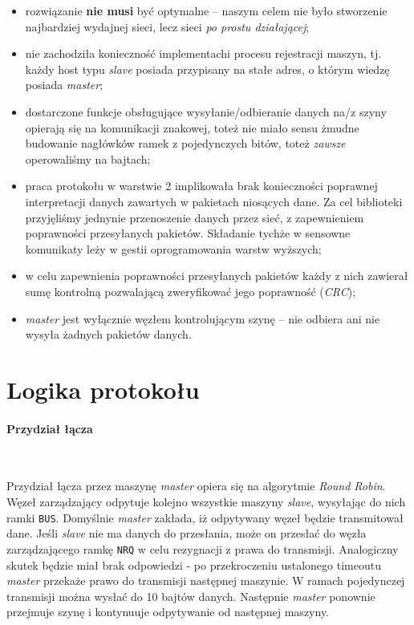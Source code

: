 \documentclass[a4paper,12pt]{article}
\begin{document}
\begin{itemize}
  \item rozwiązanie \textbf{nie musi} być optymalne -- naszym celem nie było
        stworzenie najbardziej wydajnej sieci, lecz sieci \emph{po prostu
        działającej};
  \item nie zachodziła konieczność implementachi procesu rejestracji maszyn,
        tj. każdy host typu \emph{slave} posiada przypisany na stałe adres,
        o którym wiedzę posiada \emph{master};
  \item dostarczone funkcje obsługujące wysyłanie/odbieranie danych na/z
        szyny opierają się na komunikacji znakowej, toteż nie miało sensu
        żmudne budowanie nagłówków ramek z pojedynczych bitów, toteż
        \emph{zawsze} operowaliśmy na bajtach;
  \item praca protokołu w warstwie 2 implikowała brak konieczności poprawnej
        interpretacji danych zawartych w pakietach niosących dane. Za cel
        biblioteki przyjęliśmy jednynie przenoszenie danych przez sieć, z
        zapewnieniem poprawności przesyłanych pakietów. Składanie tychże w
        sensowne komunikaty leży w gestii oprogramowania warstw wyższych;
  \item w celu zapewnienia poprawności przesyłanych pakietów każdy z nich
        zawierał sumę kontrolną pozwalającą zweryfikować jego poprawność
        (\emph{CRC});
  \item \emph{master} jest wyłącznie węzłem kontrolującym szynę -- nie
        odbiera ani nie wysyła żadnych pakietów danych.
\end{itemize}

\section{Logika protokołu}

\paragraph{Przydział łącza}\

Przydział łącza przez maszynę \emph{master} opiera się na algorytmie
\emph{Round Robin}. Węzeł zarządzający odpytuje kolejno wszystkie maszyny
\emph{slave}, wysyłając do nich ramki \texttt{BUS}. Domyślnie \emph{master}
zakłada, iż odpytywany węzeł będzie transmitował dane. Jeśli \emph{slave} nie
ma danych do przesłania, może on przesłać do węzła zarządzającego ramkę
\texttt{NRQ} w celu rezygnacji z prawa do transmisji. Analogiczny skutek będzie
miał brak odpowiedzi - po przekroczeniu ustalonego timeoutu \emph{master}
przekaże prawo do transmisji następnej maszynie. W ramach pojedynczej
transmisji można wysłać do 10 bajtów danych. Następnie \emph{master} ponownie
przejmuje szynę i kontynuuje odpytywanie od następnej maszyny.
\end{document}
